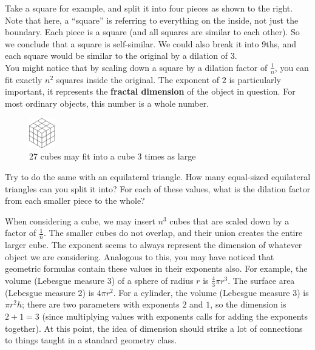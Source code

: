 Take a square for example, and split it into four pieces as shown to the right. Note that here, a ``square'' is referring to everything on the inside, not just the boundary. Each piece is a square (and all squares are similar to each other).  So we conclude that a square is self-similar. We could also break it into 9ths, and each square would be similar to the original by a dilation of 3.\\

You might notice that by scaling down a square by a dilation factor of $\frac{1}{n}$, you can fit exactly $n^2$ squares inside the original. The exponent of $2$ is particularly important, it represents the \textbf{fractal dimension} of the object in question. For most ordinary objects, this number is a whole number. \\

\begin{figure}
  \begin{center}
    \includegraphics[width=0.1\textwidth]{Images/1.4.2.png}
  \end{center}
  \caption{27 cubes may fit into a cube 3 times as large}
\end{figure}

\begin{exercise}
    Try to do the same with an equilateral triangle. How many equal-sized equilateral triangles can you split it into? For each of these values, what is the dilation factor from each smaller piece to the whole? 
\end{exercise}



When considering a cube, we may insert $n^3$ cubes that are scaled down by a factor of $\frac{1}{n}$. The smaller cubes do not overlap, and their union creates the entire larger cube. The exponent seems to always represent the dimension of whatever object we are considering. Analogous to this, you may have noticed that geometric formulas contain these values in their exponents also. For example, the volume (Lebesgue measure 3) of a sphere of radius $r$ is $\frac{4}{3}\pi r^3$. The surface area (Lebesgue measure 2) is $4\pi r^2$. For a cylinder, the volume (Lebesgue measure 3) is $\pi r^2 h$; there are two parameters with exponents $2$ and $1$, so the dimension is $2+1=3$ (since multiplying values with exponents calls for adding the exponents together). At this point, the idea of dimension should strike a lot of connections to things taught in a standard geometry class. 

